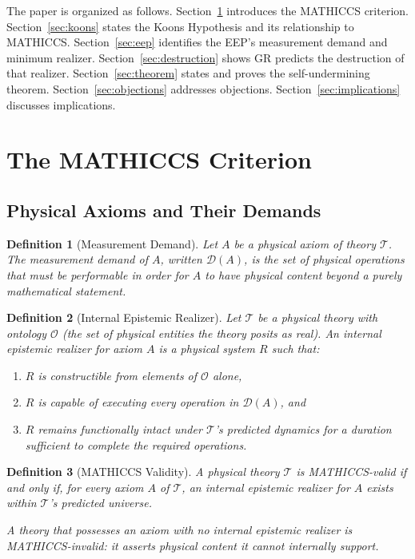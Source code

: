 \documentclass[11pt,a4paper]{article}
\newtheorem{definition}{Definition}
\begin{document}
The paper is organized as follows. Section~\ref{sec:mathiccs} introduces the MATHICCS
criterion. Section~\ref{sec:koons} states the Koons Hypothesis and its relationship to
MATHICCS. Section~\ref{sec:eep} identifies the EEP's measurement demand and minimum
realizer. Section~\ref{sec:destruction} shows GR predicts the destruction of that
realizer. Section~\ref{sec:theorem} states and proves the self-undermining theorem.
Section~\ref{sec:objections} addresses objections. Section~\ref{sec:implications}
discusses implications.

\section{The MATHICCS Criterion}
\label{sec:mathiccs}

\subsection{Physical Axioms and Their Demands}

\begin{definition}[Measurement Demand]
Let $A$ be a physical axiom of theory $\mathcal{T}$. The \emph{measurement demand}
of $A$, written $\mathcal{D}(A)$, is the set of physical operations that must be
performable in order for $A$ to have physical content beyond a purely mathematical
statement.
\end{definition}

\begin{definition}[Internal Epistemic Realizer]
Let $\mathcal{T}$ be a physical theory with ontology $\mathcal{O}$ (the set of
physical entities the theory posits as real). An \emph{internal epistemic realizer}
for axiom $A$ is a physical system $R$ such that:
\begin{enumerate}[label=(\roman*)]
\item $R$ is constructible from elements of $\mathcal{O}$ alone,
\item $R$ is capable of executing every operation in $\mathcal{D}(A)$, and
\item $R$ remains functionally intact under $\mathcal{T}$'s predicted dynamics for a
      duration sufficient to complete the required operations.
\end{enumerate}
\end{definition}

\begin{definition}[MATHICCS Validity]
\label{def:mathiccs}
A physical theory $\mathcal{T}$ is \emph{MATHICCS-valid} if and only if, for every
axiom $A$ of $\mathcal{T}$, an internal epistemic realizer for $A$ exists within
$\mathcal{T}$'s predicted universe.

A theory that possesses an axiom with no internal epistemic realizer is
\emph{MATHICCS-invalid}: it asserts physical content it cannot internally support.
\end{definition}
\end{document}
